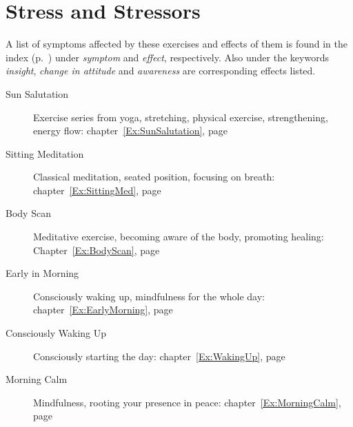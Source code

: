 \documentclass[../main.tex]{subfiles}
\begin{document}
%
\section{Stress and Stressors}

A list of symptoms affected by these exercises and effects of them is found in the index (p.~\pageref{index}) under \emph{symptom} and \emph{effect}, respectively.
Also under the keywords \emph{insight}, \emph{change in attitude} and \emph{awareness} are corresponding effects listed.

\begin{description}
\item[Sun Salutation] Exercise series from yoga, stretching, physical exercise, strengthening, energy flow:  chapter~\ref{Ex:SunSalutation}, page~\pageref{Ex:SunSalutation} %
\item[Sitting Meditation] Classical meditation, seated position, focusing on breath: chapter~\ref{Ex:SittingMed}, page~\pageref{Ex:SittingMed} %
\item[Body Scan] Meditative exercise, becoming aware of the body, promoting healing: Chapter~\ref{Ex:BodyScan}, page~\pageref{Ex:BodyScan} %
  \item[Early in Morning] Consciously waking up, mindfulness for the whole day: chapter~\ref{Ex:EarlyMorning}, page~\pageref{Ex:EarlyMorning} %
  \item[Consciously Waking Up] Consciously starting the day: chapter~\ref{Ex:WakingUp}, page~\pageref{Ex:WakingUp} %
  \item[Morning Calm] Mindfulness, rooting your presence in peace: chapter~\ref{Ex:MorningCalm}, page~\pageref{Ex:MorningCalm} %
  \end{description}
\end{document}
